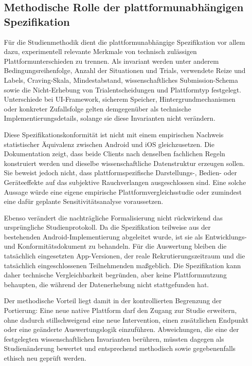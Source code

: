 
\begin{neu}
\section{Methodische Rolle der plattformunabhängigen Spezifikation}

Für die Studienmethodik dient die plattformunabhängige Spezifikation vor allem dazu, experimentell relevante Merkmale von technisch zulässigen Plattformunterschieden zu trennen. Als invariant werden unter anderem Bedingungsreihenfolge, Anzahl der Situationen und Trials, verwendete Reize und Labels, Craving-Skala, Mindestabstand, wissenschaftliches Submission-Schema sowie die Nicht-Erhebung von Trialentscheidungen und Plattformtyp festgelegt. Unterschiede bei UI-Framework, sicherem Speicher, Hintergrundmechanismen oder konkreter Zufallsfolge gelten demgegenüber als technische Implementierungsdetails, solange sie diese Invarianten nicht verändern.

Diese Spezifikationskonformität ist nicht mit einem empirischen Nachweis statistischer Äquivalenz zwischen Android und iOS gleichzusetzen. Die Dokumentation zeigt, dass beide Clients nach denselben fachlichen Regeln konstruiert werden und dieselbe wissenschaftliche Datenstruktur erzeugen sollen. Sie beweist jedoch nicht, dass plattformspezifische Darstellungs-, Bedien- oder Geräteeffekte auf das subjektive Rauchverlangen ausgeschlossen sind. Eine solche Aussage würde eine eigene empirische Plattformvergleichsstudie oder zumindest eine dafür geplante Sensitivitätsanalyse voraussetzen.

Ebenso verändert die nachträgliche Formalisierung nicht rückwirkend das ursprüngliche Studienprotokoll. Da die Spezifikation teilweise aus der bestehenden Android-Implementierung abgeleitet wurde, ist sie als Entwicklungs- und Konformitätsdokument zu behandeln. Für die Auswertung bleiben die tatsächlich eingesetzten App-Versionen, der reale Rekrutierungszeitraum und die tatsächlich eingeschlossenen Teilnehmenden maßgeblich. Die Spezifikation kann daher technische Vergleichbarkeit begründen, aber keine Plattformnutzung behaupten, die während der Datenerhebung nicht stattgefunden hat.

Der methodische Vorteil liegt damit in der kontrollierten Begrenzung der Portierung: Eine neue native Plattform darf den Zugang zur Studie erweitern, ohne dadurch stillschweigend eine neue Intervention, einen zusätzlichen Endpunkt oder eine geänderte Auswertungslogik einzuführen. Abweichungen, die eine der festgelegten wissenschaftlichen Invarianten berühren, müssten dagegen als Studienänderung bewertet und entsprechend methodisch sowie gegebenenfalls ethisch neu geprüft werden.
\end{neu}
